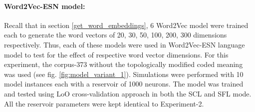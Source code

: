\paragraph{Word2Vec-ESN model:} 

Recall that in section \ref{get_word_embeddings}, 6 Word2Vec model were trained each to generate the word vectors of 20, 30, 50, 100, 200, 300 dimensions respectively. Thus, each of these models were used in Word2Vec-ESN language model to test for the effect of respective word vector dimensions. For this experiment, the corpus-373 without the topologically modified coded meaning was used (see fig. \ref{fig:model_variant_1}). Simulations were performed with 10 model instances each with a reservoir of 1000 neurons. The model was trained and tested using LoO cross-validation approach in both the SCL and SFL mode. All the reservoir parameters were kept identical to Experiment-2.
